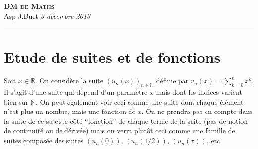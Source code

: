 \documentclass[10pt,a4paper]{article}
\newcommand{\Titre}[3]{\begin{center} {\LARGE\textbf{\textsc{#1}}}\\ #2 \hfill \emph{#3} \\  \hrule\vspace{\baselineskip}\end{center}}
\begin{document}
\Titre{DM de Maths}{Asp J.Buet}{3 décembre 2013}
\thispagestyle{plain}
\pagestyle{plain}




\section{Etude de suites et de fonctions}
Soit $x \in \mathbb{R}$.
On considère la suite $(u_n(x))_{n\in \mathbb{N}}$ définie par $u_n(x)=\sum\limits_{k=0}^nx^k$. Il s'agit d'une suite qui dépend d'un paramètre $x$
 mais dont les indices varient bien sur $\mathbb{N}$. On peut également voir ceci comme une suite dont chaque élément n'est plus un nombre, mais
 une fonction de $x$. On ne prendra pas en compte dans la suite de ce sujet le côté ``fonction'' de chaque terme de la suite (pas de notion de
 continuité ou de dérivée) mais on verra plutôt ceci comme une famille de suites composée des suites $(u_n(0))$, $(u_n(1/2))$, $(u_n(\pi))$, etc.
\end{document}
